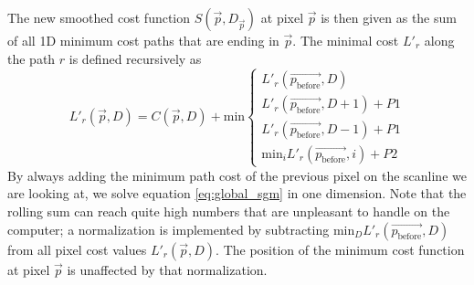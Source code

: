 \documentclass  [
  paper    = a4,
  BCOR     = 10mm,
  twoside,
  fontsize = 12pt,
  fleqn,
  toc      = bibnumbered,
  toc      = listofnumbered,
  numbers  = noendperiod,
  headings = normal,
  listof   = leveldown,
  version  = 3.03
]                                       {scrreprt}
\begin{document}
The new smoothed cost function $S(\vec p , D_{\vec p})$ at pixel $\vec{p}$ is then given as the sum of all 1D minimum cost paths that are ending in $\vec{p}$.  The minimal cost $L'_r$ along the path $r$ is defined recursively as
\begin{equation}\label{eq:local_sgm}
L'_r(\vec{p}, D) = C(\vec{p}, D) + \text {min}
\begin{cases}
	L'_r(\vec{p_\text{before}}, D) \\
	L'_r(\vec{p_\text{before}}, D+1)+P1 \\
	L'_r(\vec{p_\text{before}}, D-1)+P1 \\
	\text{min}_i L'_r(\vec{p_\text{before}}, i)+P2 
\end{cases}
\end{equation} 
By always adding the minimum path cost of the previous pixel on the scanline we are looking at, we solve equation \ref{eq:global_sgm} in one dimension. Note that the rolling sum can reach quite high numbers that are unpleasant to handle on the computer; a normalization is implemented by subtracting min$_D L'_r(\vec{p_\text{before}}, D)$ from all pixel cost values $L'_r(\vec{p}, D)$. The position of the minimum cost function at pixel $\vec p$ is unaffected by that normalization.
\end{document}
